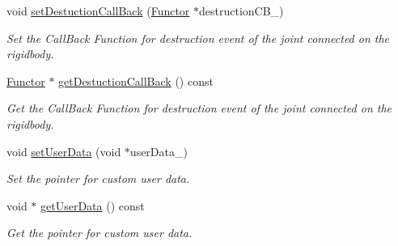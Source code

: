 \begin{DoxyCompactItemize}
void \hyperlink{class_i_dream_sky_1_1_physics3_1_1_rigid_body_a2ffcb6cb2ddf0f264d4d7df2c45319c2}{set\+Destuction\+Call\+Back} (\hyperlink{class_i_dream_sky_1_1_functor}{Functor} $\ast$destruction\+C\+B\+\_\+)
\begin{DoxyCompactList}\small\item\em Set the Call\+Back Function for destruction event of the joint connected on the rigidbody. \end{DoxyCompactList}\item 
\hyperlink{class_i_dream_sky_1_1_functor}{Functor} $\ast$ \hyperlink{class_i_dream_sky_1_1_physics3_1_1_rigid_body_abec3467cdf36209d4c97d611adfab805}{get\+Destuction\+Call\+Back} () const 
\begin{DoxyCompactList}\small\item\em Get the Call\+Back Function for destruction event of the joint connected on the rigidbody. \end{DoxyCompactList}\item 
void \hyperlink{class_i_dream_sky_1_1_physics3_1_1_rigid_body_af8ca239d5d3b384b7fd40aa33b5ee20f}{set\+User\+Data} (void $\ast$user\+Data\+\_\+)
\begin{DoxyCompactList}\small\item\em Set the pointer for custom user data. \end{DoxyCompactList}\item 
void $\ast$ \hyperlink{class_i_dream_sky_1_1_physics3_1_1_rigid_body_a06204907d5fc684e249d486d816a73f3}{get\+User\+Data} () const 
\begin{DoxyCompactList}\small\item\em Get the pointer for custom user data. \end{DoxyCompactList}\end{DoxyCompactItemize}
